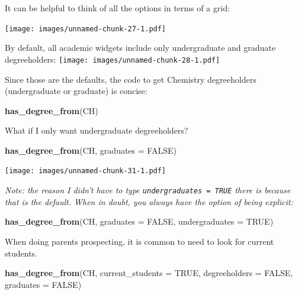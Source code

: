\documentclass[]{book}
\newenvironment{Shaded}{\begin{snugshade}}{\end{snugshade}}
\newcommand{\DataTypeTok}[1]{\textcolor[rgb]{0.13,0.29,0.53}{#1}}
\newcommand{\KeywordTok}[1]{\textcolor[rgb]{0.13,0.29,0.53}{\textbf{#1}}}
\newcommand{\NormalTok}[1]{#1}
\newcommand{\OtherTok}[1]{\textcolor[rgb]{0.56,0.35,0.01}{#1}}
\begin{document}
It can be helpful to think of all the options in terms of a grid:

\texttt{[image: images/unnamed-chunk-27-1.pdf]}

By default, all academic widgets include only undergraduate and graduate degreeholders:
\texttt{[image: images/unnamed-chunk-28-1.pdf]}

Since those are the defaults, the code to get Chemistry degreeholders (undergraduate or graduate) is concise:

\begin{Shaded}
\begin{Highlighting}[]
\KeywordTok{has_degree_from}\NormalTok{(CH)}
\end{Highlighting}
\end{Shaded}

What if I only want undergraduate degreeholders?

\begin{Shaded}
\begin{Highlighting}[]
\KeywordTok{has_degree_from}\NormalTok{(CH, }\DataTypeTok{graduates =} \OtherTok{FALSE}\NormalTok{)}
\end{Highlighting}
\end{Shaded}

\texttt{[image: images/unnamed-chunk-31-1.pdf]}

\emph{Note: the reason I didn't have to type \texttt{undergraduates\ =\ TRUE} there is because that is the default. When in doubt, you always have the option of being explicit:}

\begin{Shaded}
\begin{Highlighting}[]
\KeywordTok{has_degree_from}\NormalTok{(CH, }\DataTypeTok{graduates =} \OtherTok{FALSE}\NormalTok{, }\DataTypeTok{undergraduates =} \OtherTok{TRUE}\NormalTok{)}
\end{Highlighting}
\end{Shaded}

When doing parents prospecting, it is common to need to look for current students.

\begin{Shaded}
\begin{Highlighting}[]
\KeywordTok{has_degree_from}\NormalTok{(CH, }
                \DataTypeTok{current_students =} \OtherTok{TRUE}\NormalTok{, }\DataTypeTok{degreeholders =} \OtherTok{FALSE}\NormalTok{, }
                \DataTypeTok{graduates =} \OtherTok{FALSE}\NormalTok{)}
\end{Highlighting}
\end{Shaded}
\end{document}
